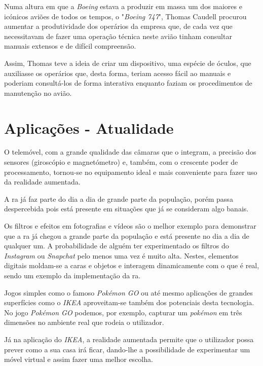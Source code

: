 \documentclass{report}
\begin{document}
Numa altura em que a \textit{Boeing} estava a produzir em massa um dos maiores e icónicos aviões de todos os tempos, o "\textit{Boeing 747}", Thomas Caudell procurou aumentar a produtividade dos operários da empresa que, de cada vez que necessitavam de fazer uma operação técnica neste avião tinham consultar manuais extensos e de difícil compreensão.

Assim, Thomas teve a ideia de criar um dispositivo, uma espécie de óculos, que auxiliasse os operários que, desta forma, teriam acesso fácil ao manuais e poderiam consultá-los de forma interativa enquanto faziam os procedimentos de manutenção no avião.

\section{Aplicações - Atualidade}
O telemóvel, com a grande qualidade das câmaras que o integram, a precisão dos sensores (giroscópio e magnetómetro) e, também, com o crescente poder de processamento, tornou-se no equipamento ideal e mais conveniente para fazer uso da realidade aumentada.

A \ac{ra} já faz parte do dia a dia de grande parte da população, porém passa despercebida pois está presente em situações que já se consideram algo banais.

Os filtros e efeitos em fotografias e vídeos são o melhor exemplo para demonstrar que a \ac{ra} já chegou a grande parte da população e está presente no dia a dia de qualquer um. A probabilidade de alguém ter experimentado os filtros do \textit{Instagram} ou \textit{Snapchat} pelo menos uma vez é muito alta. Nestes, elementos digitais moldam-se a caras e objetos e interagem dinamicamente com o que é real, sendo um exemplo da implementação da \ac{ra}.

Jogos simples como o famoso \textit{Pokémon GO} ou até mesmo aplicações de grandes superfícies como o \textit{IKEA} aproveitam-se também dos potenciais desta tecnologia. No jogo \textit{Pokémon GO} podemos, por exemplo, capturar um \textit{pokémon} em três dimensões no ambiente real que rodeia o utilizador.

Já na aplicação do \textit{IKEA}, a realidade aumentada permite que o utilizador possa prever como a sua casa irá ficar, dando-lhe a possibilidade de experimentar um móvel virtual e assim fazer uma melhor escolha.
\end{document}
